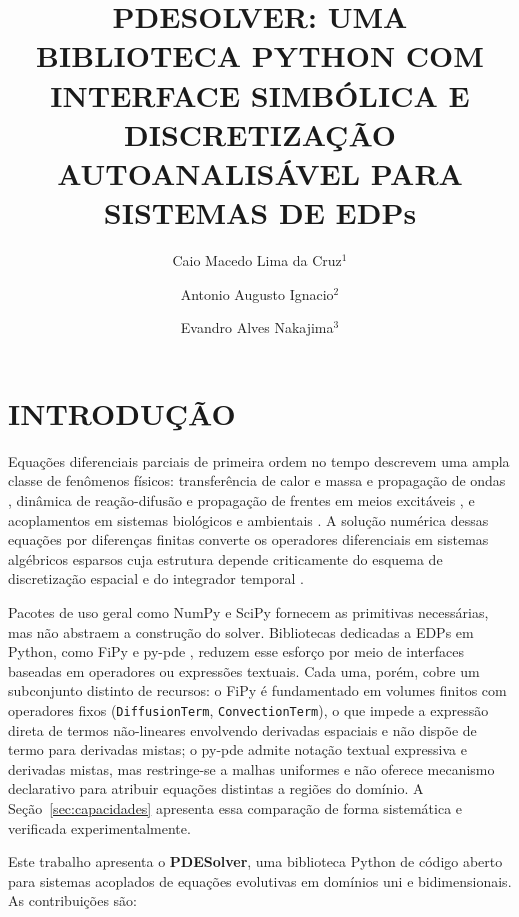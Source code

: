 \documentclass[10pt,brazil,english]{article}
\title{PDESOLVER: UMA BIBLIOTECA PYTHON COM INTERFACE SIMBÓLICA E DISCRETIZAÇÃO AUTOANALISÁVEL PARA SISTEMAS DE EDPs}
\author{
  Caio Macedo Lima da Cruz$^{1}$ \and
  Antonio Augusto Ignacio$^{2}$\and
  Evandro Alves Nakajima$^{3}$
}
\begin{document}
\maketitle
\onecolumn

\section{INTRODUÇÃO}

Equações diferenciais parciais de primeira ordem no tempo descrevem uma ampla classe de fenômenos físicos: transferência de calor e massa e propagação de ondas \cite{strikwerda2004,leveque2007}, dinâmica de reação-difusão e propagação de frentes em meios excitáveis \cite{hundsdorfer2003}, e acoplamentos em sistemas biológicos e ambientais \cite{okubo2001}. A solução numérica dessas equações por diferenças finitas converte os operadores diferenciais em sistemas algébricos esparsos cuja estrutura depende criticamente do esquema de discretização espacial e do integrador temporal \cite{morton1994,hundsdorfer2003}.

Pacotes de uso geral como NumPy \cite{harris2020} e SciPy \cite{SciPy2020} fornecem as primitivas necessárias, mas não abstraem a construção do solver. Bibliotecas dedicadas a EDPs em Python, como FiPy \cite{guyer2009} e py-pde \cite{zwicker2020}, reduzem esse esforço por meio de interfaces baseadas em operadores ou expressões textuais. Cada uma, porém, cobre um subconjunto distinto de recursos: o FiPy é fundamentado em volumes finitos com operadores fixos (\texttt{DiffusionTerm}, \texttt{ConvectionTerm}), o que impede a expressão direta de termos não-lineares envolvendo derivadas espaciais e não dispõe de termo para derivadas mistas; o py-pde admite notação textual expressiva e derivadas mistas, mas restringe-se a malhas uniformes e não oferece mecanismo declarativo para atribuir equações distintas a regiões do domínio. A Seção~\ref{sec:capacidades} apresenta essa comparação de forma sistemática e verificada experimentalmente.

Este trabalho apresenta o \textbf{PDESolver}, uma biblioteca Python de código aberto para sistemas acoplados de equações evolutivas em domínios uni e bidimensionais. As contribuições são:
\end{document}
